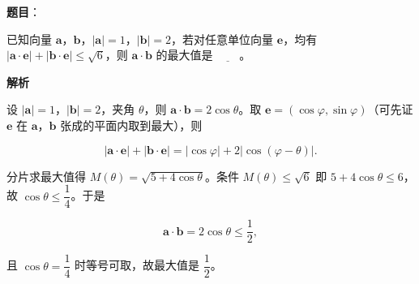 \begin{answer}

\textbf{题目}：

已知向量 \(\mathbf{a}\)，\(\mathbf{b}\)，\(|\mathbf{a}|=1\)，\(|\mathbf{b}|=2\)，若对任意单位向量 \(\mathbf{e}\)，均有 \(|\mathbf{a}\cdot\mathbf{e}|+|\mathbf{b}\cdot\mathbf{e}|\leqslant\sqrt{6}\)，则 \(\mathbf{a}\cdot\mathbf{b}\) 的最大值是 \(\underline{\qquad}\)。

\textbf{解析}

设 \(|\boldsymbol{a}|=1\)，\(|\boldsymbol{b}|=2\)，夹角 \(\theta\)，则 \(\boldsymbol{a}\cdot\boldsymbol{b}=2\cos\theta\)。取 \(\boldsymbol{e}=(\cos\varphi,\sin\varphi)\)（可先证 \(\boldsymbol{e}\) 在 \(\boldsymbol{a}\)，\(\boldsymbol{b}\) 张成的平面内取到最大），则

\nopagebreak[4]
\[
|\boldsymbol{a}\cdot\boldsymbol{e}|+|\boldsymbol{b}\cdot\boldsymbol{e}|=|\cos\varphi|+2|\cos(\varphi-\theta)|.
\]

分片求最大值得 \(M(\theta)=\sqrt{5+4\cos\theta}\)。条件 \(M(\theta)\leqslant\sqrt{6}\) 即 \(5+4\cos\theta\leqslant 6\)，故 \(\cos\theta\leqslant\dfrac{1}{4}\)。于是

\nopagebreak[4]
\[
\boldsymbol{a}\cdot\boldsymbol{b}=2\cos\theta\leqslant\dfrac{1}{2},
\]

且 \(\cos\theta=\dfrac{1}{4}\) 时等号可取，故最大值是 \(\dfrac{1}{2}\)。


\end{answer}
